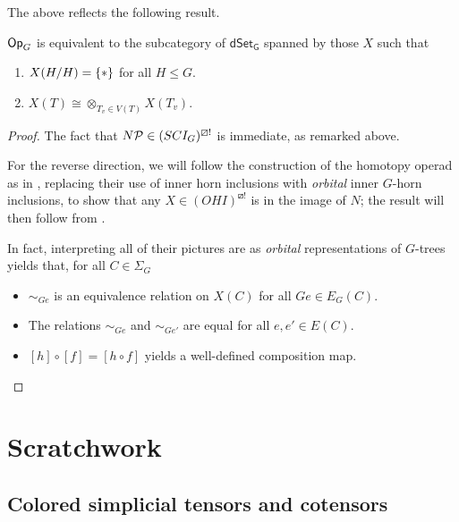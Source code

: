 \documentclass[a4paper,10pt
,draft
]{article}%
\begin{document}
The above reflects the following result.

\begin{proposition}
      $\Op_G$ is equivalent to the subcategory of $\mathsf{dSet_G}$ spanned by those $X$ such that
      \begin{enumerate}
      \item $X(H/H) = \set{\**}$ for all $H \leq G$.
      \item $X(T) \cong \otimes_{T_v \in V(T)}X(T_v)$. 
      \end{enumerate}
\end{proposition}
\begin{proof}
      The fact that $N\P \in (SCI_G)^{\boxslash !}$ is immediate, as remarked above.

      For the reverse direction, we will follow the construction of the homotopy operad as in \cite[\S 6]{MW09},
      replacing their use of inner horn inclusions with \textit{orbital} inner $G$-horn inclusions,
      to show that any $X \in (OHI)^{\boxslash !}$ is in the image of $N$; 
      the result will then follow from \cite[HYPER PROP]{BP18}.

      In fact, interpreting all of their pictures are as \textit{orbital} representations of $G$-trees yields that,
      for all $C \in \Sigma_G$
      \begin{itemize}
      \item $\sim_{G e}$ is an equivalence relation on $X(C)$ for all $Ge \in E_G(C)$.
      \item The relations $\sim_{G e}$ and $\sim_{G e'}$ are equal for all $e,e'\in E(C)$.
      \item $[h] \circ [f] = [h \circ f]$ yields a well-defined composition map. 
      \end{itemize}
\end{proof}



\newpage



\section{Scratchwork}

\subsection{Colored simplicial tensors and cotensors}
\end{document}
